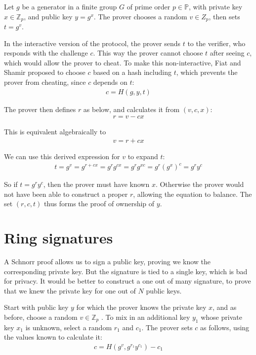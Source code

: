 \documentclass{article}
\begin{document}
Let $g$ be a generator in a finite group $G$ of prime order $p \in \mathbb{P}$, with private key $x \in \mathbb{Z}_p$, and public key $y = g^x$. The prover chooses a random $v \in Z_p$, then sets $t = g^v$.

In the interactive version of the protocol, the prover sends $t$ to the verifier, who responds with the challenge $c$.  This way the prover cannot choose $t$ after seeing $c$, which would allow the prover to cheat.  To make this non-interactive, Fiat and Shamir proposed to choose $c$ based on a hash including $t$, which prevents the prover from cheating, since $c$ depends on $t$:
\begin{align}
  c = H(g,y,t)
\end{align}

The prover then defines $r$ as below, and calculates it from $(v, c, x)$:
\begin{align}
  r = v - cx
\end{align}
 
This is equivalent algebraically to
\begin{align}
  v = r + cx
\end{align}

We can use this derived expression for $v$ to expand $t$:
\begin{align}
  t = g^v= g^{r + c x} = g^r g^{cx} = g^r g^{xc} = g^r (g^x)^c = g^r y^c
\end{align}

So if $t = g^r y^c$, then the prover must have known $x$.  Otherwise the prover would not have been able to construct a proper $r$, allowing the equation to balance.  The set $(r,c,t)$ thus forms the proof of ownership of $y$.



\section{Ring signatures}

A Schnorr proof allows us to sign a public key, proving we know the corresponding private key.  But the signature is tied to a single key, which is bad for privacy.  It would be better to construct a one out of many signature, to prove that we knew the private key for one out of $N$ public keys.

Start with public key $y$ for which the prover knows the private key $x$, and as before, choose a random $v \in \mathbb{Z}_p$ . To mix in an additional key $y_1$ whose private key $x_1$ is unknown, select a random $r_1$ and $c_1$.  The prover sets $c$ as follows, using the values known to calculate it:
\begin{align}
  c = H(g^v, g^{r_1} y^{c_1}) - c_1
\end{align}
\end{document}
